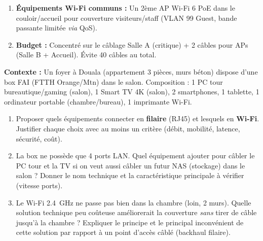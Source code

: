 \documentclass[11pt]{article}
\newcounter{popsec}
\newcounter{popsub}
\newcommand{\courssub}[1]{%
  \stepcounter{popsub}%
  \par\vspace{9pt}\noindent{\popxbold\fontsize{11.5}{13}\selectfont\color{popink}{\color{poporange}\thepopsec.\thepopsub}\hspace{6pt}#1}\par\nopagebreak\vspace{4pt}
}
\begin{document}
\begin{exoresolu}
\begin{enumerate}
\begin{itemize}
        \end{itemize}
    \item \textbf{Équipements Wi-Fi communs :} Un 2ème AP Wi-Fi 6 PoE dans le couloir/accueil pour couverture visiteurs/staff (VLAN 99 Guest, bande passante limitée \emph{via} QoS).
    \item \textbf{Budget :} Concentré sur le câblage Salle A (critique) + 2 câbles pour APs (Salle B + Accueil). Évite 40 câbles au total.
\end{enumerate}
\end{exoresolu}

\courssub{Exercice d'application}

\begin{exercice}
\textbf{Contexte :} Un foyer à Douala (appartement 3 pièces, murs béton) dispose d'une box FAI (FTTH Orange/Mtn) dans le salon. Composition : 1 PC tour bureautique/gaming (salon), 1 Smart TV 4K (salon), 2 smartphones, 1 tablette, 1 ordinateur portable (chambre/bureau), 1 imprimante Wi-Fi.
\begin{enumerate}
    \item Proposer quels équipements connecter en \textbf{filaire} (RJ45) et lesquels en \textbf{Wi-Fi}. Justifier chaque choix avec au moins un critère (débit, mobilité, latence, sécurité, coût).
    \item La box ne possède que 4 ports LAN. Quel équipement ajouter pour câbler le PC tour et la TV si on veut aussi câbler un futur NAS (stockage) dans le salon ? Donner le nom technique et la caractéristique principale à vérifier (vitesse ports).
    \item Le Wi-Fi \SI{2,4}{GHz} ne passe pas bien dans la chambre (loin, 2 murs). Quelle solution technique peu coûteuse améliorerait la couverture \emph{sans} tirer de câble jusqu'à la chambre ? Expliquer le principe et le principal inconvénient de cette solution par rapport à un point d'accès câblé (backhaul filaire).
\end{enumerate}
\end{exercice}
\end{document}
